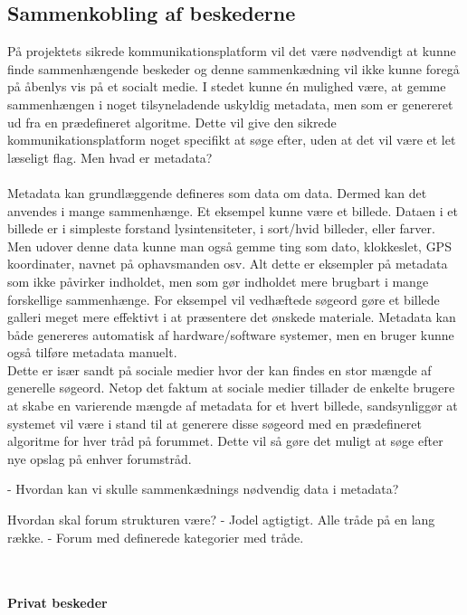 
\subsection{Sammenkobling af beskederne}
På projektets sikrede kommunikationsplatform vil det være nødvendigt at kunne finde sammenhængende beskeder og denne sammenkædning vil ikke kunne foregå på åbenlys vis på et socialt medie. I stedet kunne én mulighed være, at gemme sammenhængen i noget tilsyneladende uskyldig metadata, men som er genereret ud fra en prædefineret algoritme. Dette vil give den sikrede kommunikationsplatform noget specifikt at søge efter, uden at det vil være et let læseligt flag. Men hvad er metadata?\\\\
Metadata kan grundlæggende defineres som data om data. Dermed kan det anvendes i mange sammenhænge. Et eksempel kunne være et billede. Dataen i et billede er i simpleste forstand lysintensiteter, i sort/hvid billeder, eller farver. Men udover denne data kunne man også gemme ting som dato, klokkeslet, GPS koordinater, navnet på ophavsmanden osv. Alt dette er eksempler på metadata som ikke påvirker indholdet, men som gør indholdet mere brugbart i mange forskellige sammenhænge. For eksempel vil vedhæftede søgeord gøre et billede galleri meget mere effektivt i at præsentere det ønskede materiale. Metadata kan både genereres automatisk af hardware/software systemer, men en bruger kunne også tilføre metadata manuelt.\\ Dette er især sandt på sociale medier hvor der kan findes en stor mængde af generelle søgeord. Netop det faktum at sociale medier tillader de enkelte brugere at skabe en varierende mængde af metadata for et hvert billede, sandsynliggør at systemet vil være i stand til at generere disse søgeord med en prædefineret algoritme for hver tråd på forummet. Dette vil så gøre det muligt at søge efter nye opslag på enhver forumstråd.


- Hvordan kan vi skulle sammenkædnings nødvendig data i metadata?

Hvordan skal forum strukturen være?
- Jodel agtigtigt. Alle tråde på en lang række.
- Forum med definerede kategorier med tråde.

\\\\
\textbf{Privat beskeder}\\

